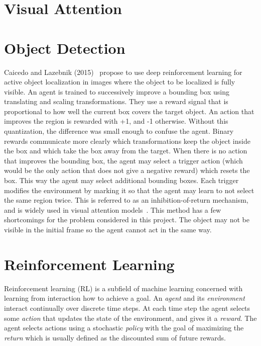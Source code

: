 
\section{Visual Attention}


\section{Object Detection}


Caicedo and Lazebnik (2015)~\cite{aol} propose to use deep reinforcement learning for active object localization in images where the object to be localized is fully visible. An agent is trained to successively improve a bounding box using translating and scaling transformations. They use a reward signal that is proportional to how well the current box covers the target object. An action that improves the region is rewarded with +1, and -1 otherwise. Without this quantization, the difference was small enough to confuse the agent. Binary rewards communicate more clearly which transformations keep the object inside the box and which take the box away from the target. When there is no action that improves the bounding box, the agent may select a trigger action (which would be the only action that does not give a negative reward) which resets the box. This way the agent may select additional bounding boxes. Each trigger modifies the environment by marking it so that the agent may learn to not select the same region twice. This is referred to as an inhibition-of-return mechanism, and is widely used in visual attention models~\cite{16 in aol}. This method has a few shortcomings for the problem considered in this project. The object may not be visible in the initial frame so the agent cannot act in the same way. 

\section{Reinforcement Learning}

Reinforcement learning (RL) is a subfield of machine learning concerned with learning from interaction how to achieve a goal. An \textit{agent} and its \textit{environment} interact continually over discrete time steps. At each time step the agent selects some \textit{action} that updates the state of the environment, and gives it a \textit{reward}. The agent selects actions using a stochastic \textit{policy} with the goal of maximizing the \textit{return} which is usually defined as the discounted sum of future rewards.

